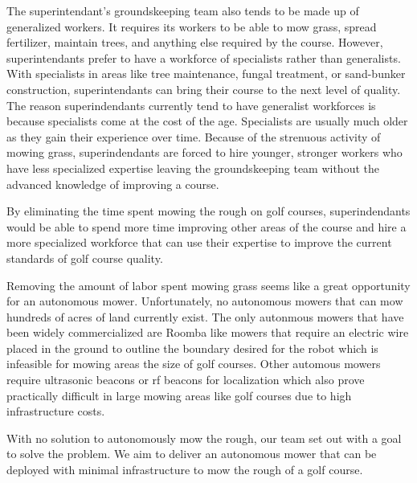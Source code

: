 \documentclass[12pt]{extarticle}
\begin{document}
The superintendant's groundskeeping team also tends to be made up of generalized workers.  It requires its workers to be able to mow grass, spread fertilizer, maintain trees, and anything else required by the course.  However, superintendants prefer to have a workforce of specialists rather than generalists.  With specialists in areas like tree maintenance, fungal treatment, or sand-bunker construction, superintendants can bring their course to the next level of quality.  The reason superindendants currently tend to have generalist workforces is because specialists come at the cost of the age.  Specialists are usually much older as they gain their experience over time.  Because of the strenuous activity of mowing grass, superindendants are forced to hire younger, stronger workers who have less specialized expertise leaving the groundskeeping team without the advanced knowledge of improving a course.

By eliminating the time spent mowing the rough on golf courses, superindendants would be able to spend more time improving other areas of the course and hire a more specialized workforce that can use their expertise to improve the current standards of golf course quality.

Removing the amount of labor spent mowing grass seems like a great opportunity for an autonomous mower.  Unfortunately, no autonomous mowers that can mow hundreds of acres of land currently exist.  The only autonmous mowers that have been widely commercialized are Roomba like mowers that require an electric wire placed in the ground to outline the boundary desired for the robot which is infeasible for mowing areas the size of golf courses.  Other automous mowers require ultrasonic beacons or rf beacons for localization which also prove practically difficult in large mowing areas like golf courses due to high infrastructure costs.

With no solution to autonomously mow the rough, our team set out with a goal to solve the problem.  We aim to deliver an autonomous mower that can be deployed with minimal infrastructure to mow the rough of a golf course.

\newpage
\end{document}
